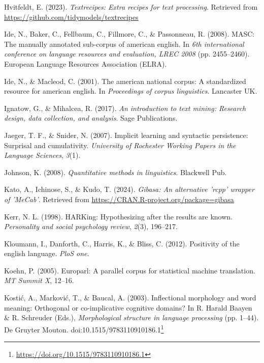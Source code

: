 \documentclass[
  letterpaper,
]{latex/krantz}
\newlength{\cslhangindent}
\newenvironment{CSLReferences}[2] %
 {\begin{list}{}{%
  \setlength{\itemindent}{0pt}
  \setlength{\leftmargin}{0pt}
  \setlength{\parsep}{0pt}
  \ifodd #1
   \setlength{\leftmargin}{\cslhangindent}
   \setlength{\itemindent}{-1\cslhangindent}
  \fi
  \setlength{\itemsep}{#2\baselineskip}}}
 {\end{list}}
\theoremstyle{definition}
\theoremstyle{remark}
\DeclareRobustCommand{\href}[2]{#2\footnote{\url{#1}}}
\begin{document}
\begin{CSLReferences}{1}{0}
Hvitfeldt, E. (2023). \emph{Textrecipes: Extra recipes for text
processing}. Retrieved from
\url{https://github.com/tidymodels/textrecipes}

Ide, N., Baker, C., Fellbaum, C., Fillmore, C., \& Passonneau, R.
(2008). MASC: The manually annotated sub-corpus of american english. In
\emph{6th international conference on language resources and evaluation,
LREC 2008} (pp. 2455--2460). European Language Resources Association
(ELRA).

Ide, N., \& Macleod, C. (2001). The american national corpus: A
standardized resource for american english. In \emph{Proceedings of
corpus linguistics}. Lancaster UK.

Ignatow, G., \& Mihalcea, R. (2017). \emph{An introduction to text
mining: Research design, data collection, and analysis}. Sage
Publications.

Jaeger, T. F., \& Snider, N. (2007). Implicit learning and syntactic
persistence: Surprisal and cumulativity. \emph{University of Rochester
Working Papers in the Language Sciences}, \emph{3}(1).

Johnson, K. (2008). \emph{Quantitative methods in linguistics}.
Blackwell Pub.

Kato, A., Ichinose, S., \& Kudo, T. (2024). \emph{Gibasa: An alternative
'rcpp' wrapper of 'MeCab'}. Retrieved from
\url{https://CRAN.R-project.org/package=gibasa}

Kerr, N. L. (1998). HARKing: Hypothesizing after the results are known.
\emph{Personality and social psychology review}, \emph{2}(3), 196--217.

Kloumann, I., Danforth, C., Harris, K., \& Bliss, C. (2012). Positivity
of the english language. \emph{PloS one}.

Koehn, P. (2005). Europarl: A parallel corpus for statistical machine
translation. \emph{MT Summit X}, 12--16.

Kostić, A., Marković, T., \& Baucal, A. (2003). Inflectional morphology
and word meaning: Orthogonal or co-implicative cognitive domains? In R.
Harald Baayen \& R. Schreuder (Eds.), \emph{Morphological structure in
language processing} (pp. 1--44). De Gruyter Mouton.
doi:\href{https://doi.org/10.1515/9783110910186.1}{10.1515/9783110910186.1}


\end{CSLReferences}
\end{document}
